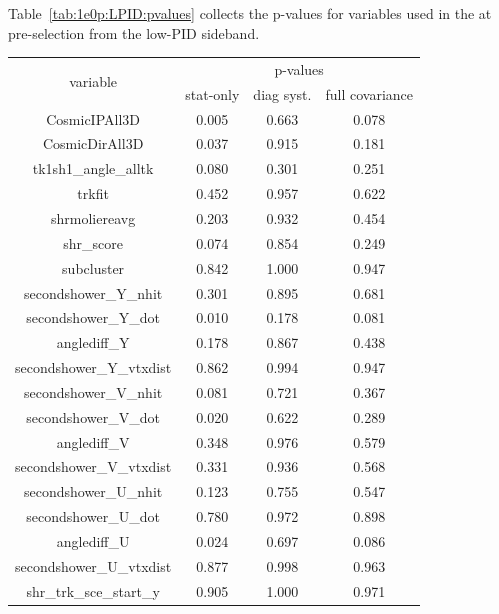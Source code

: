 Table~\ref{tab:1e0p:LPID:pvalues} collects the p-values for variables used in the \zpsel at pre-selection from the low-PID sideband.


\begin{table}[H]
\centering
\setlength{\tabcolsep}{10pt}
\renewcommand{\arraystretch}{1.25}
\begin{tabular}{| c | c | c | c | } 
 \hline
\multirow{2}{*}{variable} & \multicolumn{3}{c|}{p-values} \\
\cline{2-4} & stat-only & diag syst. & full covariance \\ \hline
CosmicIPAll3D & 0.005 & 0.663 & 0.078 \\ \hline
CosmicDirAll3D & 0.037 & 0.915 & 0.181 \\ \hline
tk1sh1\_angle\_alltk & 0.080 & 0.301 & 0.251 \\ \hline
trkfit & 0.452 & 0.957 & 0.622 \\ \hline
shrmoliereavg & 0.203 & 0.932 & 0.454 \\ \hline
shr\_score & 0.074 & 0.854 & 0.249 \\ \hline
subcluster & 0.842 & 1.000 & 0.947 \\ \hline
secondshower\_Y\_nhit & 0.301 & 0.895 & 0.681 \\ \hline
secondshower\_Y\_dot & 0.010 & 0.178 & 0.081 \\ \hline
anglediff\_Y & 0.178 & 0.867 & 0.438 \\ \hline
secondshower\_Y\_vtxdist & 0.862 & 0.994 & 0.947 \\ \hline
secondshower\_V\_nhit & 0.081 & 0.721 & 0.367 \\ \hline
secondshower\_V\_dot & 0.020 & 0.622 & 0.289 \\ \hline
anglediff\_V & 0.348 & 0.976 & 0.579 \\ \hline
secondshower\_V\_vtxdist & 0.331 & 0.936 & 0.568 \\ \hline
secondshower\_U\_nhit & 0.123 & 0.755 & 0.547 \\ \hline
secondshower\_U\_dot & 0.780 & 0.972 & 0.898 \\ \hline
anglediff\_U & 0.024 & 0.697 & 0.086 \\ \hline
secondshower\_U\_vtxdist & 0.877 & 0.998 & 0.963 \\ \hline
shr\_trk\_sce\_start\_y & 0.905 & 1.000 & 0.971 \\ \hline

\end{tabular}
\end{table}
